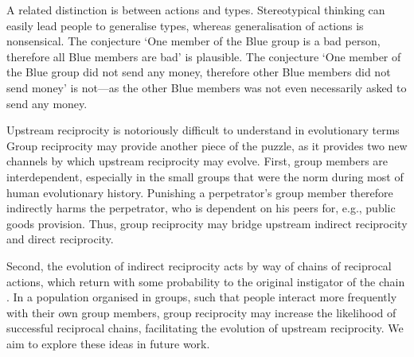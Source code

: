 \documentclass[12pt,a4paper]{article}
\begin{document}
A related distinction is between actions and types. Stereotypical
thinking can easily lead people to generalise types, whereas generalisation
of actions is nonsensical. The conjecture `One member of the Blue
group is a bad person, therefore all Blue members are bad' is plausible.
The conjecture `One member of the Blue group did not send any money,
therefore other Blue members did not send money' is not---as the other
Blue members was not even necessarily asked to send any money.



Upstream reciprocity is notoriously difficult to understand in evolutionary
terms \citep{boyd1989evolution,nowak2007upstream} Group reciprocity
may provide another piece of the puzzle, as it provides two new channels
by which upstream reciprocity may evolve. First, group members are
interdependent, especially in the small groups that were the norm
during most of human evolutionary history. Punishing a perpetrator's
group member therefore indirectly harms the perpetrator, who is dependent
on his peers for, e.g., public goods provision. Thus, group reciprocity
may bridge upstream indirect reciprocity and direct reciprocity.

Second, the evolution of indirect reciprocity acts by way of chains
of reciprocal actions, which return with some probability to the original
instigator of the chain \citep{nowak2007upstream}. In a population
organised in groups, such that people interact more frequently with
their own group members, group reciprocity may increase the likelihood
of successful reciprocal chains, facilitating the evolution of upstream
reciprocity. We aim to explore these ideas in future work.


\newpage
\printbibliography
%
%
\end{document}
